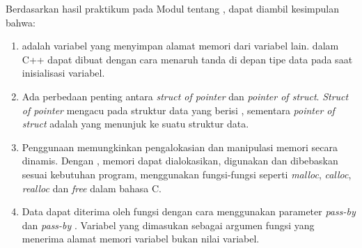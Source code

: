 \documentclass[../main.tex]{subfiles}
\begin{document}
    Berdasarkan hasil praktikum pada Modul {} tentang {\leftmark}, dapat diambil kesimpulan bahwa:
    \begin{enumerate}
        \item {\Pointer} adalah variabel yang menyimpan alamat memori dari variabel lain. {\Pointer} dalam C++ dapat dibuat dengan cara menaruh tanda \citecode{*} di depan tipe data pada saat inisialisasi variabel.
        \item Ada perbedaan penting antara \textit{struct of pointer} dan \textit{pointer of struct}. \textit{Struct of pointer} mengacu pada struktur data yang berisi {\pointer}, sementara \textit{pointer of struct} adalah {\pointer} yang menunjuk ke suatu struktur data.
        \item Penggunaan {\pointer} memungkinkan pengalokasian dan manipulasi memori secara dinamis. Dengan {\pointer}, memori dapat dialokasikan, digunakan dan dibebaskan sesuai kebutuhan program, menggunakan fungsi-fungsi seperti \textit{malloc}, \textit{calloc}, \textit{realloc} dan \textit{free} dalam bahasa C.
        \item Data dapat diterima oleh fungsi dengan cara menggunakan parameter \textit{pass-by} {\pointer} dan \textit{pass-by} {}. Variabel yang dimasukan sebagai argumen fungsi yang menerima alamat memori variabel bukan nilai variabel.
    \end{enumerate}
\end{document}
